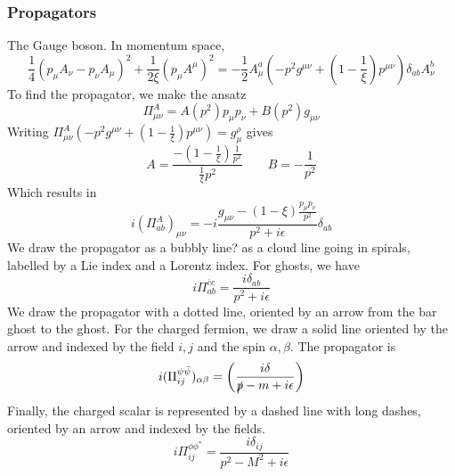 \documentclass[a4paper]{book}
\theoremstyle{definition}
\theoremstyle{remark}
\begin{document}
\subsubsection{Propagators}
The Gauge boson. In momentum space, 
\begin{equation}
    \frac{1}{4}(p_\mu A_\nu - p_\nu A_\mu)^2 + \frac{1}{2\xi}(p_\mu A^\mu)^2 = -\frac{1}{2}A^a_\mu (-p^2g^{\mu\nu} + (1 - \frac{1}{\xi})p^{\mu\nu})\delta_{ab}A^b_\nu
\end{equation}
To find the propagator, we make the ansatz 
\begin{equation}
    \Pi^A_{\mu\nu} = A(p^2)p_{\mu}p_{\nu} + B(p^2)g_{\mu\nu}
\end{equation}
Writing $\Pi^A_{\mu\nu}(-p^2g^{\mu\nu} + (1 - \frac{1}{\xi})p^{\mu\nu}) = g_\mu^\rho$ gives 
\begin{equation}
    A = \frac{-(1 - \frac{1}{\xi})\frac{1}{p^2}}{\frac{1}{\xi}p^2} \qquad B = -\frac{1}{p^2}
\end{equation}
Which results in 
\begin{equation}
    i(\Pi^A_{ab})_{\mu\nu} = -i \frac{g_{\mu\nu}- (1-\xi)\frac{p_\mu p_\nu}{p^2}}{p^2 + i\epsilon} \delta_{ab}
\end{equation}
We draw the propagator as a bubbly line? as a cloud line going in spirals, labelled by a Lie index and a Lorentz index. For ghosts, we have 
\begin{equation}
  i\Pi^{\bar c c}_{ab} = \frac{i\delta_{ab}}{p^2 + i\epsilon}  
\end{equation}
We draw the propagator with a dotted line, oriented by an arrow from the bar ghost to the ghost. For the charged fermion, we draw a solid line oriented by the arrow and indexed by the field $i,j$ and the spin $\alpha, \beta$. The propagator is 
\begin{equation}
    i(\Pi_{ij}^{\psi \bar \psi})_{\alpha \beta} = \left(\frac{i\delta}{\slashed{p} - m + i\epsilon}\right)
\end{equation}
Finally, the charged scalar is represented by a dashed line with long dashes, oriented by an arrow and indexed by the fields.
\begin{equation}
    i\Pi^{\phi\phi^*}_{ij} = \frac{i\delta_{ij}}{p^2 - M^2 + i\epsilon}
\end{equation}
\end{document}
